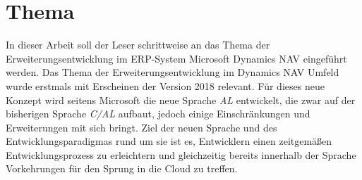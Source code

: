 \chapter{Thema}
\label{cha:Thema}

In dieser Arbeit soll der Leser schrittweise an das Thema der Erweiterungsentwicklung im ERP-System Microsoft Dynamics NAV eingeführt werden. 
Das Thema der Erweiterungsentwicklung im Dynamics NAV Umfeld wurde erstmals mit Erscheinen der Version 2018 relevant. Für dieses neue Konzept wird seitens Microsoft die neue Sprache \emph{AL} entwickelt, die zwar auf der bisherigen Sprache \emph{C/AL} aufbaut, jedoch einige Einschränkungen und Erweiterungen mit sich bringt. Ziel der neuen Sprache und des Entwicklungsparadigmas rund um sie ist es, Entwicklern einen zeitgemäßen Entwicklungsprozess zu erleichtern und gleichzeitig bereits innerhalb der Sprache Vorkehrungen für den Sprung in die Cloud zu treffen. 